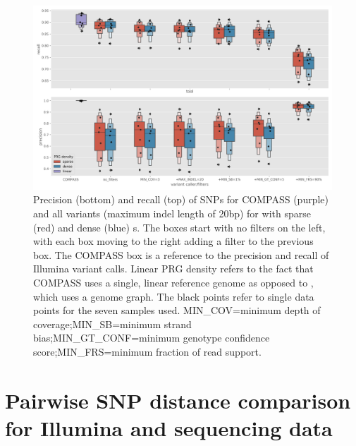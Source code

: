 \begin{figure}
\begin{center}
\includegraphics[width=0.70\columnwidth]{Chapter2/Figs/pandora-precision-recall-filters-all-variants.png}
\caption{{Precision (bottom) and recall (top) of SNPs for COMPASS (purple) and all variants (maximum indel length of 20bp) for \pandora{} with sparse (red) and dense (blue) \prg{}s. The \pandora{} boxes start with no filters on the left, with each box moving to the right adding a filter to the previous box. The COMPASS box is a reference to the precision and recall of Illumina variant calls. Linear PRG density refers to the fact that COMPASS uses a single, linear reference genome as opposed to \pandora{}, which uses a genome graph. The black points refer to single data points for the seven samples used. MIN\_COV=minimum depth of coverage;MIN\_SB=minimum strand bias;MIN\_GT\_CONF=minimum genotype confidence score;MIN\_FRS=minimum fraction of read support.
{\label{fig:pandora-filters-all}}%
}}
\end{center}
\end{figure}



\section{Pairwise SNP distance comparison for Illumina and \ont{} sequencing data}

